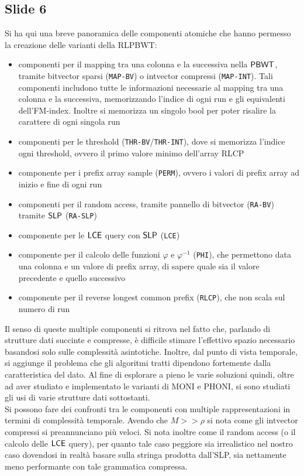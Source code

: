 \documentclass[a4paper,11pt, oneside,italian]{article}
\def\SLP{\mbox{\rm {\sf SLP}}}
\def\LCE{\mbox{\rm {\sf LCE}}}
\def\PBWT{\mbox{\rm {\sf PBWT}}}
\def\LCE{\mbox{\rm {\sf LCE}}}
\begin{document}
\subsection*{Slide 6}
Si ha qui una breve panoramica delle componenti atomiche che hanno permesso la
creazione delle varianti della RLPBWT:
\begin{itemize}
  \item componenti per il mapping tra una colonna e la successiva nella
  $\PBWT$, tramite bitvector sparsi (\texttt{MAP-BV}) o intvector compressi
  (\texttt{MAP-INT}). Tali componenti includono tutte le informazioni necessarie
  al mapping tra una colonna e la successiva, memorizzando l'indice di ogni run
  e gli 
  equivalenti dell'FM-index. Inoltre si memorizza un singolo bool per poter
  risalire la carattere di ogni singola run
  \item componenti per le threshold (\texttt{THR-BV}/\texttt{THR-INT}), dove si
  memorizza l'indice ogni threshold, ovvero il primo valore minimo dell'array
  RLCP 
  \item componente per i prefix array sample (\texttt{PERM}), ovvero i valori di
  prefix array ad inizio e fine di ogni run
  \item componenti per il random access, tramite pannello di bitvector
  (\texttt{RA-BV}) tramite $\SLP$ (\texttt{RA-SLP})
  \item componente per le $\LCE$ query con $\SLP$ (\texttt{LCE})
  \item componente per il calcolo delle funzioni $\varphi$ e $\varphi^{-1}$
  (\texttt{PHI}), che permettono data una colonna e un valore di prefix array,
  di sapere quale sia il valore precedente e quello successivo
  \item componente per il reverse longest common prefix (\texttt{RLCP}), che non
  scala sul numero di run
\end{itemize}
Il senso di queste multiple componenti si ritrova nel fatto che, parlando di
strutture dati succinte e compresse, è difficile stimare l'effettivo spazio
necessario basandosi solo sulle complessità asintotiche. Inoltre, dal punto di
vista temporale, si aggiunge il problema che gli algoritmi tratti dipendono
fortemente dalla caratteristica del dato. Al fine di esplorare a pieno le varie
soluzioni quindi, oltre ad aver studiato e implementato le varianti di MONI e
PHONI, si sono studiati gli usi di varie strutture dati sottostanti.\\
Si possono fare dei confronti tra le componenti con
multiple rappresentazioni in termini di complessità temporale. Avendo che
$M>>\rho$ si nota come gli intvector compressi si preannunciano più veloci.
Si nota inoltre come il random access (o il calcolo delle $\LCE$ query), per
quanto tale caso peggiore sia irrealistico nel nostro caso dovendosi in realtà
basare sulla stringa prodotta dall'SLP, sia nettamente meno performante con tale
grammatica compressa.
\end{document}

